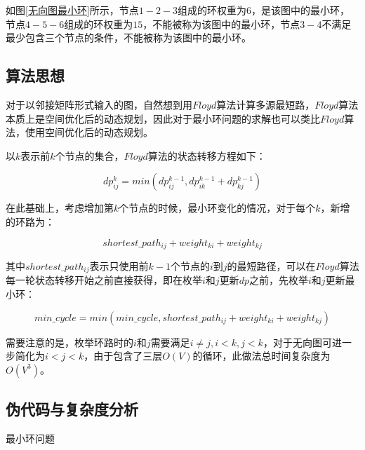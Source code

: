 \documentclass{article}
\begin{document}
如图\ref{无向图最小环}所示，节点$1-2-3$组成的环权重为$6$，是该图中的最小环，节点$4-5-6$组成的环权重为$15$，不能被称为该图中的最小环，节点$3-4$不满足最少包含三个节点的条件，不能被称为该图中的最小环。

\subsection{算法思想}

对于以邻接矩阵形式输入的图，自然想到用$Floyd$算法计算多源最短路，$Floyd$算法本质上是空间优化后的动态规划，因此对于最小环问题的求解也可以类比$Floyd$算法，使用空间优化后的动态规划。

以$k$表示前$k$个节点的集合，$Floyd$算法的状态转移方程如下：

$$
dp_{ij}^k=min(dp_{ij}^{k-1},dp_{ik}^{k-1}+dp_{kj}^{k-1})
$$

在此基础上，考虑增加第$k$个节点的时候，最小环变化的情况，对于每个$k$，新增的环路为：

$$
shortest\_path_{ij}+weight_{ki}+weight_{kj}
$$

其中$shortest\_path_{ij}$表示只使用前$k-1$个节点的$i$到$j$的最短路径，可以在$Floyd$算法每一轮状态转移开始之前直接获得，即在枚举$i$和$j$更新$dp$之前，先枚举$i$和$j$更新最小环：

$$
min\_cycle=min(min\_cycle,shortest\_path_{ij}+weight_{ki}+weight_{kj})
$$

需要注意的是，枚举环路时的$i$和$j$需要满足$i\ne{j},i<k,j<k$，对于无向图可进一步简化为$i<j<k$，由于包含了三层$O(V)$的循环，此做法总时间复杂度为$O(V^3)$。

\subsection{伪代码与复杂度分析}

\begin{algorithm}[H]

\caption{最小环问题}
\LinesNumbered
{}


\end{algorithm}
\end{document}
